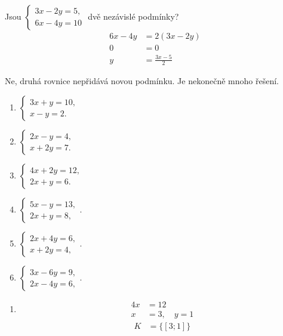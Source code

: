 \documentclass[11pt,a4paper]{article}
\begin{document}
\begin{zadaniReseniBox}[title={Samostatná práce 4}]
Jsou $\begin{cases}3x-2y=5,\\6x-4y=10\end{cases}$ dvě nezávislé podmínky?
\tcblower
\begin{align*}
6x-4y&=2(3x-2y) \\
 0&=0 \\
 y&=\frac{3x-5}{2}
\end{align*}

Ne, druhá rovnice nepřidává novou podmínku. Je nekonečně mnoho řešení.
\end{zadaniReseniBox}
\begin{zadaniReseniBox}[title={Domácí úkol}]
\begin{enumerate}[label=\alph*)]
\item $\begin{cases}3x+y=10,\\x-y=2.\end{cases}$
\item $\begin{cases}2x-y=4,\\x+2y=7.\end{cases}$
\item $\begin{cases}4x+2y=12,\\2x+y=6.\end{cases}$
\item $\begin{cases}5x-y=13,\\2x+y=8,\end{cases}$.
\item $\begin{cases}2x+4y=6,\\x+2y=4,\end{cases}$.
\item $\begin{cases}3x-6y=9,\\2x-4y=6,\end{cases}$.
\end{enumerate}
\tcblower
\begin{enumerate}[label=\alph*)]
\item
\[\begin{aligned}
4x&=12 \\
 x&=3,\quad y=1
\end{aligned}\]
\[\begin{aligned}K&=\{[3;1]\}\end{aligned}\]


\end{enumerate}
\end{zadaniReseniBox}
\end{document}
